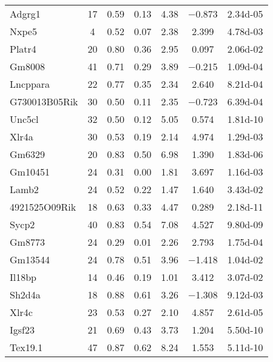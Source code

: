 {\begin{longtable}[l]{p{3.6cm}cccccc}
Adgrg1	& \num{17}	& \num{0.59}	& \num{0.13}	& \num{4.38}	& \num{-0.873}	& \num{2.34d-05}\\ 
Nxpe5	& \num{ 4}	& \num{0.52}	& \num{0.07}	& \num{2.38}	& \num{ 2.399}	& \num{4.78d-03}\\ 
Platr4	& \num{20}	& \num{0.80}	& \num{0.36}	& \num{2.95}	& \num{ 0.097}	& \num{2.06d-02}\\ 
Gm8008	& \num{41}	& \num{0.71}	& \num{0.29}	& \num{3.89}	& \num{-0.215}	& \num{1.09d-04}\\ 
Lncppara	& \num{22}	& \num{0.77}	& \num{0.35}	& \num{2.34}	& \num{ 2.640}	& \num{8.21d-04}\\ 
G730013B05Rik	& \num{30}	& \num{0.50}	& \num{0.11}	& \num{2.35}	& \num{-0.723}	& \num{6.39d-04}\\ 
Unc5cl	& \num{32}	& \num{0.50}	& \num{0.12}	& \num{5.05}	& \num{ 0.574}	& \num{1.81d-10}\\ 
Xlr4a	& \num{30}	& \num{0.53}	& \num{0.19}	& \num{2.14}	& \num{ 4.974}	& \num{1.29d-03}\\ 
Gm6329	& \num{20}	& \num{0.83}	& \num{0.50}	& \num{6.98}	& \num{ 1.390}	& \num{1.83d-06}\\ 
Gm10451	& \num{24}	& \num{0.31}	& \num{0.00}	& \num{1.81}	& \num{ 3.697}	& \num{1.16d-03}\\ 
Lamb2	& \num{24}	& \num{0.52}	& \num{0.22}	& \num{1.47}	& \num{ 1.640}	& \num{3.43d-02}\\ 
4921525O09Rik	& \num{18}	& \num{0.63}	& \num{0.33}	& \num{4.47}	& \num{ 0.289}	& \num{2.18d-11}\\ 
Sycp2	& \num{40}	& \num{0.83}	& \num{0.54}	& \num{7.08}	& \num{ 4.527}	& \num{9.80d-09}\\ 
Gm8773	& \num{24}	& \num{0.29}	& \num{0.01}	& \num{2.26}	& \num{ 2.793}	& \num{1.75d-04}\\ 
Gm13544	& \num{24}	& \num{0.78}	& \num{0.51}	& \num{3.96}	& \num{-1.418}	& \num{1.04d-02}\\ 
Il18bp	& \num{14}	& \num{0.46}	& \num{0.19}	& \num{1.01}	& \num{ 3.412}	& \num{3.07d-02}\\ 
Sh2d4a	& \num{18}	& \num{0.88}	& \num{0.61}	& \num{3.26}	& \num{-1.308}	& \num{9.12d-03}\\ 
Xlr4c	& \num{23}	& \num{0.53}	& \num{0.27}	& \num{2.10}	& \num{ 4.857}	& \num{2.61d-05}\\ 
Igsf23	& \num{21}	& \num{0.69}	& \num{0.43}	& \num{3.73}	& \num{ 1.204}	& \num{5.50d-10}\\ 
Tex19.1	& \num{47}	& \num{0.87}	& \num{0.62}	& \num{8.24}	& \num{ 1.553}	& \num{5.11d-10}\\ 

\end{longtable}}
